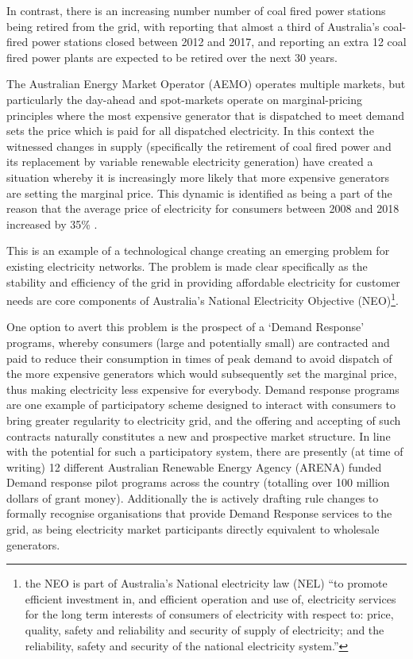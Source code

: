 In contrast, there is an increasing number number of coal fired power stations being retired from the grid,
with \cite{doi:10.1111/1467-8489.12289} reporting that almost a third of Australia's coal-fired power stations closed between 2012 and 2017,
and \cite{australianenergymarketoperatorlimited2018} reporting an extra 12 coal fired power plants are expected to be retired over the next 30 years.

The Australian Energy Market Operator (AEMO) operates multiple markets, but particularly the day-ahead and spot-markets operate on marginal-pricing principles where the most expensive generator that is dispatched to meet demand sets the price which is paid for all dispatched electricity.
In this context the witnessed changes in supply (specifically the retirement of coal fired power and its replacement by variable renewable electricity generation) have created a situation whereby it is increasingly more likely that more expensive generators are setting the marginal price.
This dynamic is identified as being a part of the reason that the average price of electricity for consumers between 2008 and 2018 increased by 35\% \citep{australiancompetitionconsumercommission2018}.

This is an example of a technological change creating an emerging problem for existing electricity networks. The problem is made clear specifically as the stability and efficiency of the grid in providing affordable electricity for customer needs are core components of Australia's National Electricity Objective (NEO)\footnote{the NEO is part of Australia's National electricity law (NEL) ``to promote efficient investment in, and efficient operation and use of, electricity services for the long term interests of consumers of electricity with respect to: price, quality, safety and reliability and security of supply of electricity; and the reliability, safety and security of the national electricity system.''}.

One option to avert this problem is the prospect of a `Demand Response' programs, whereby consumers (large and potentially small) are contracted and paid to reduce their consumption in times of peak demand to avoid dispatch of the more expensive generators which would subsequently set the marginal price, thus making electricity less expensive for everybody.
Demand response programs are one example of participatory scheme designed to interact with consumers to bring greater regularity to electricity grid, and the offering and accepting of such contracts naturally constitutes a new and prospective market structure.
In line with the potential for such a participatory system, there are presently (at time of writing) 12 different Australian Renewable Energy Agency (ARENA) funded Demand response pilot programs across the country (totalling over 100 million dollars of grant money).
Additionally the \cite{australianenergymarketcommission2020} is actively drafting rule changes to formally recognise organisations that provide Demand Response services to the grid, as being electricity market participants directly equivalent to wholesale generators.

